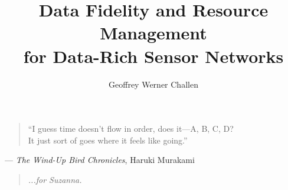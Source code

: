 
\title{Data Fidelity and Resource Management\\for Data-Rich Sensor Networks}
\author{Geoffrey Werner Challen}

\maketitle
\copyrightpage


\begin{abstract}

\end{abstract}


{\ssp
\epigram
\vspace*{50pt}
\begin{quote} 
``I guess time doesn't flow in order, does it---A, B, C, D?\\It just sort of
goes where it feels like going.''
\end{quote}
\hfill--- \textit{The Wind-Up Bird Chronicles}, Haruki Murakami}
\newpage


{\ssp
{}
\tableofcontents
\newpage
\listoffigures
\listoftables}


\begin{acknowledgments}

\end{acknowledgments}


{\ssp
\dedication
\vspace*{50pt}
\begin{quote}
\hfill \textit{...for Suzanna.}
\end{quote}}
\newpage


\startarabicpagination
